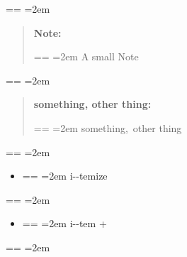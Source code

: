 \documentclass{book}
\makeatletter
\newenvironment{GNUTexinfopreformatted}{%
  \par\obeylines\obeyspaces\frenchspacing
  \parskip=\z@\parindent=\z@}{}
\makeatother
\begin{document}
\begin{GNUTexinfopreformatted}
\leftskip=2em\relax\ttfamily%

\end{GNUTexinfopreformatted}
\begin{quote}
\begin{footnotesize}
\textbf{Note:} \begin{GNUTexinfopreformatted}
\leftskip=2em\relax\ttfamily%
A small Note
\end{GNUTexinfopreformatted}
\end{footnotesize}
\end{quote}
\begin{GNUTexinfopreformatted}
\leftskip=2em\relax\ttfamily%

\end{GNUTexinfopreformatted}
\begin{quote}
\begin{footnotesize}
\textbf{something, other thing:} \begin{GNUTexinfopreformatted}
\leftskip=2em\relax\ttfamily%
something,\ other thing
\end{GNUTexinfopreformatted}
\end{footnotesize}
\end{quote}
\begin{GNUTexinfopreformatted}
\leftskip=2em\relax\ttfamily%

\end{GNUTexinfopreformatted}
\begin{itemize}
\item \begin{GNUTexinfopreformatted}
\leftskip=2em\relax\ttfamily%
i{-}{-}temize
\end{GNUTexinfopreformatted}
\end{itemize}
\begin{GNUTexinfopreformatted}
\leftskip=2em\relax\ttfamily%

\end{GNUTexinfopreformatted}
\begin{itemize}[label=+]
\item \begin{GNUTexinfopreformatted}
\leftskip=2em\relax\ttfamily%
i{-}{-}tem +
\end{GNUTexinfopreformatted}
\end{itemize}
\begin{GNUTexinfopreformatted}
\leftskip=2em\relax\ttfamily%

\end{GNUTexinfopreformatted}
\end{document}
